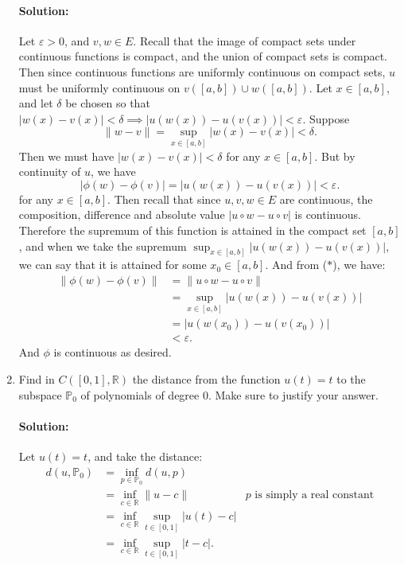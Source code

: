 \documentclass{article}
\begin{document}
\begin{enumerate}
    \paragraph{Solution: } Let $\varepsilon>0$, and $v,w\in E$. Recall that the image of compact sets under continuous functions is compact, and the union of compact sets is compact. Then since continuous functions are uniformly continuous on compact sets, $u$ must be uniformly continuous on $v([a,b])\cup w([a,b])$. Let $x\in [a,b]$, and let $\delta$ be chosen so that $|w(x)-v(x)|<\delta\implies|u(w(x))-u(v(x))|<\varepsilon$. 
    Suppose
    \[
        \|w-v\|= \sup_{x\in [a,b]}|w(x)-v(x)| <\delta \tag{$*$}
    .\] 
    Then we must have $|w(x)-v(x)|<\delta$ for any $x\in [a,b]$. But by continuity of $u$, we have 
    \[ |\phi(w)-\phi(v)|=|u(w(x))-u(v(x))|<\varepsilon .\] 
    for any $x\in [a,b]$. Then recall that since $u,v,w\in E$ are continuous, the composition, difference and absolute value $|u\circ w-u\circ v|$ is continuous. Therefore the supremum of this function is attained in the compact set $[a,b]$, and when we take the supremum $\sup_{x\in [a,b]}|u(w(x))-u(v(x))|$, we can say that it is attained for some $x_0\in [a,b]$. And from ($*$), we have:
    \begin{align*}
        \|\phi(w)-\phi(v)\|&=\|u\circ w-u\circ v\|\\
                           &=\sup_{x\in [a,b]}|u(w(x))-u(v(x))|\\
                           &=|u(w(x_0))-u(v(x_0))|\\
                           &<\varepsilon
    .\end{align*}
    And $\phi$ is continuous as desired.

\item  Find in $C([0,1],\mathbb{R})$ the distance from the function $u(t)=t$ to the subspace $\mathbb{P}_0$ of polynomials of degree $0.$ Make sure to justify your answer.
    \paragraph{Solution: }Let $u(t)=t$, and take the distance:
    \begin{align*}
        d(u,\mathbb{P}_0)&=\inf_{p\in \mathbb{P}_0}d(u,p)\\
        &= \inf_{c\in \mathbb{R}}\|u-c\| &\text{$p$ is simply a real constant}\\
        &= \inf_{c\in \mathbb{R}}\sup_{t\in [0,1]}|u(t)-c|\\
        &= \inf_{c\in \mathbb{R}}\sup_{t\in [0,1]}|t-c|
    .\end{align*}


\end{enumerate}
\end{document}
